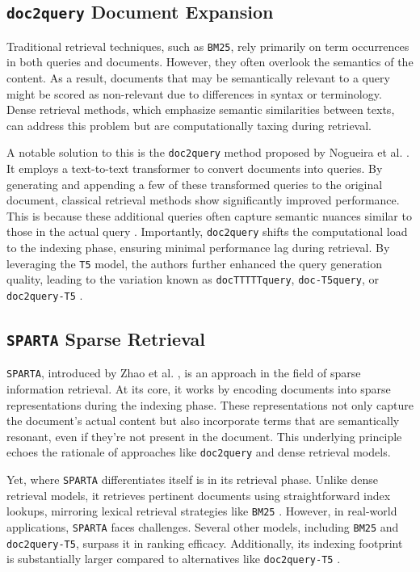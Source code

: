 \documentclass[sigconf]{acmart}
\begin{document}
\subsection*{\texttt{doc2query} Document Expansion}\label{sec:doc2query}
Traditional retrieval techniques, such as \texttt{BM25}, rely primarily on term occurrences in both queries and documents. However, they often overlook the semantics of the content. As a result, documents that may be semantically relevant to a query might be scored as non-relevant due to differences in syntax or terminology. Dense retrieval methods, which emphasize semantic similarities between texts, can address this problem but are computationally taxing during retrieval.

A notable solution to this is the \texttt{doc\-2query} method proposed by Nogueira et al. \cite{nogueira2019document}. It employs a text-to-text transformer to convert documents into queries. By generating and appending a few of these transformed queries to the original document, classical retrieval methods show significantly improved performance. This is because these additional queries often capture semantic nuances similar to those in the actual query \cite{nogueira2019document,nogueira2019doc2query,pradeep2021expando}. Importantly, \texttt{doc\-2query} shifts the computational load to the indexing phase, ensuring minimal performance lag during retrieval. By leveraging the \texttt{T5} model, the authors further enhanced the query generation quality, leading to the variation known as \texttt{doc\-TTTTTquery}, \texttt{doc\--T5query}, or \texttt{doc\-2query\--T5} \cite{nogueira2019doc2query}.

\subsection*{\texttt{SPARTA} Sparse Retrieval}\label{sec:sparta}
\texttt{SPARTA}, introduced by Zhao et al. \cite{zhao2020sparta}, is an approach in the field of sparse information retrieval. At its core, it works by encoding documents into sparse representations during the indexing phase. These representations not only capture the document's actual content but also incorporate terms that are semantically resonant, even if they're not present in the document. This underlying principle echoes the rationale of approaches like \texttt{doc2query} and dense retrieval models.

Yet, where \texttt{SPARTA} differentiates itself is in its retrieval phase. Unlike dense retrieval models, it retrieves pertinent documents using straightforward index lookups, mirroring lexical retrieval strategies like \texttt{BM25} \cite{zhao2020sparta}. However, in real-world applications, \texttt{SPARTA} faces challenges. Several other models, including \texttt{BM25} and \texttt{doc2query-T5}, surpass it in ranking efficacy. Additionally, its indexing footprint is substantially larger compared to alternatives like \texttt{doc2query-T5} \cite{thakur2021beir}.
\end{document}
